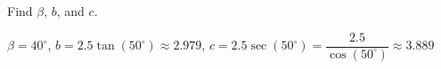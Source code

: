 {Find $\beta$, $b$, and $c$.  

\begin{center}
\end{center}}
{$\beta = 40^{\circ}$, $b = 2.5 \tan(50^{\circ}) \approx 2.979$, $c = 2.5\sec(50^{\circ}) = \dfrac{2.5}{\cos(50^{\circ})} \approx 3.889$}